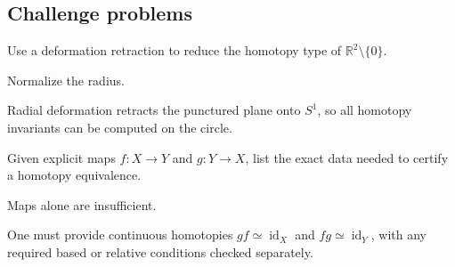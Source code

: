 \subsection*{Challenge problems}

\begin{exercise}\label{exr:viii02-ped-15}
Use a deformation retraction to reduce the homotopy type of $\mathbb R^2\setminus\{0\}$.
\end{exercise}
\begin{hint}
Normalize the radius.
\end{hint}
\begin{solution}
Radial deformation retracts the punctured plane onto $S^1$, so all homotopy invariants can be computed on the circle.
\end{solution}

\begin{exercise}\label{exr:viii02-ped-16}
Given explicit maps $f:X\to Y$ and $g:Y\to X$, list the exact data needed to certify a homotopy equivalence.
\end{exercise}
\begin{hint}
Maps alone are insufficient.
\end{hint}
\begin{solution}
One must provide continuous homotopies $g f\simeq\operatorname{id}_X$ and $f g\simeq\operatorname{id}_Y$, with any required based or relative conditions checked separately.
\end{solution}

